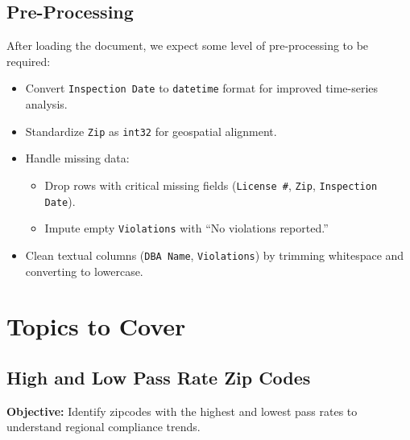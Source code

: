 \documentclass[12pt]{article}
\begin{document}
\subsection*{Pre-Processing}
After loading the document, we expect some level of pre-processing to be required:
\begin{itemize}
    \item Convert \texttt{Inspection Date} to \texttt{datetime} format for improved time-series analysis.
    \item Standardize \texttt{Zip} as \texttt{int32} for geospatial alignment.
    \item Handle missing data:
    \begin{itemize}
        \item Drop rows with critical missing fields (\texttt{License \#}, \texttt{Zip}, \texttt{Inspection Date}).
        \item Impute empty \texttt{Violations} with ``No violations reported.''
    \end{itemize}
    \item Clean textual columns (\texttt{DBA Name}, \texttt{Violations}) by trimming whitespace and converting to lowercase.
\end{itemize}

\section*{Topics to Cover}
\subsection*{High and Low Pass Rate Zip Codes}
\textbf{Objective:} Identify zipcodes with the highest and lowest pass rates to understand regional compliance trends.
\end{document}
